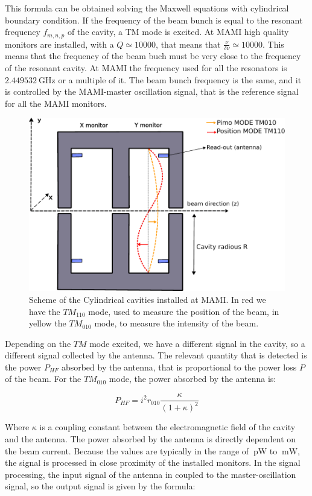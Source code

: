 This formula can be obtained solving the Maxwell equations with cylindrical boundary condition.
If the frequency of the beam bunch is equal to the resonant frequency $f_{m,n,p}$ of the cavity, a TM mode is excited. At MAMI high quality monitors are installed, with a $Q \simeq 10000$, that means that $\frac{\nu}{\delta \nu} \simeq 10000$. This means that the frequency of the beam buch must be very close to the frequency of the resonant cavity. At MAMI the frequency used for all the resonators is $\SI{2.449532}{\giga \hertz}$ or a multiple of it. The beam bunch frequency is the same, and it is controlled by the MAMI-master oscillation signal, that is the reference signal for all the MAMI monitors.

\begin{figure}[hbtp]
\centering
\includegraphics[width = 0.6 \textwidth]{ExperimentalSetup/Monitors.pdf}
\caption{Scheme of the Cylindrical cavities installed at MAMI. In red we have the $TM_{110}$ mode, used to measure the position of the beam, in yellow the $TM_{010}$ mode, to measure the intensity of the beam.}
\label{fig:CylindricMonit}
\end{figure}

Depending on the $TM$ mode excited, we have a different signal in the cavity, so a different signal collected by the antenna. The relevant quantity that is detected is the power $P_{HF}$ absorbed by the antenna, that is proportional to the power loss $P$ of the beam. For the $TM_{010}$ mode,  the power absorbed by the antenna is: 

\begin{equation}
P_{HF} = i^{2} r_{010} \frac{\kappa}{(1 + \kappa)^{2}}
\end{equation}

Where $\kappa$ is a coupling constant between the electromagnetic field of the cavity and the antenna.
The power absorbed by the antenna is directly dependent on the beam current. Because the values are typically in the range of $\SI{}{\pico \watt}$ to $\SI{}{\milli \watt }$, the signal is processed in close proximity of the installed monitors. In the signal processing, the input signal of the antenna in coupled to the master-oscillation signal, so the output signal is given by the formula:

